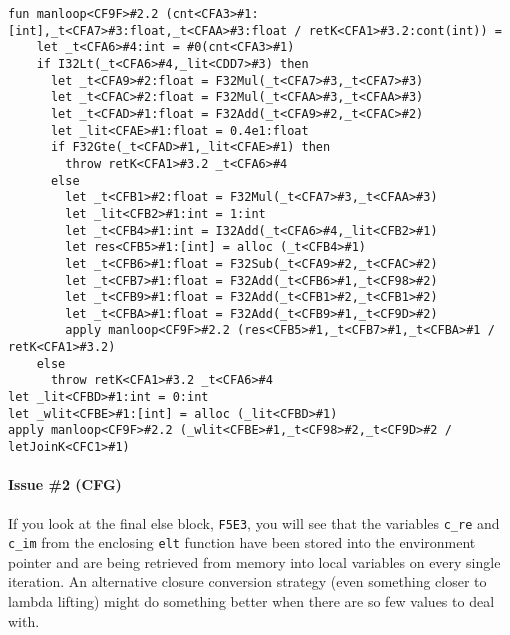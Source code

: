 \documentclass[11pt]{article}
\begin{document}
\begin{lstlisting}
fun manloop<CF9F>#2.2 (cnt<CFA3>#1:[int],_t<CFA7>#3:float,_t<CFAA>#3:float / retK<CFA1>#3.2:cont(int)) =
    let _t<CFA6>#4:int = #0(cnt<CFA3>#1)
    if I32Lt(_t<CFA6>#4,_lit<CDD7>#3) then
      let _t<CFA9>#2:float = F32Mul(_t<CFA7>#3,_t<CFA7>#3)
      let _t<CFAC>#2:float = F32Mul(_t<CFAA>#3,_t<CFAA>#3)
      let _t<CFAD>#1:float = F32Add(_t<CFA9>#2,_t<CFAC>#2)
      let _lit<CFAE>#1:float = 0.4e1:float
      if F32Gte(_t<CFAD>#1,_lit<CFAE>#1) then
        throw retK<CFA1>#3.2 _t<CFA6>#4
      else
        let _t<CFB1>#2:float = F32Mul(_t<CFA7>#3,_t<CFAA>#3)
        let _lit<CFB2>#1:int = 1:int
        let _t<CFB4>#1:int = I32Add(_t<CFA6>#4,_lit<CFB2>#1)
        let res<CFB5>#1:[int] = alloc (_t<CFB4>#1)
        let _t<CFB6>#1:float = F32Sub(_t<CFA9>#2,_t<CFAC>#2)
        let _t<CFB7>#1:float = F32Add(_t<CFB6>#1,_t<CF98>#2)
        let _t<CFB9>#1:float = F32Add(_t<CFB1>#2,_t<CFB1>#2)
        let _t<CFBA>#1:float = F32Add(_t<CFB9>#1,_t<CF9D>#2)
        apply manloop<CF9F>#2.2 (res<CFB5>#1,_t<CFB7>#1,_t<CFBA>#1 / retK<CFA1>#3.2)
    else
      throw retK<CFA1>#3.2 _t<CFA6>#4
let _lit<CFBD>#1:int = 0:int
let _wlit<CFBE>#1:[int] = alloc (_lit<CFBD>#1)
apply manloop<CF9F>#2.2 (_wlit<CFBE>#1,_t<CF98>#2,_t<CF9D>#2 / letJoinK<CFC1>#1)
\end{lstlisting}

\paragraph{Issue \#2 (CFG)}
If you look at the final else block, \texttt{F5E3}, you will see that the variables \texttt{c\_re} and \texttt{c\_im} from the enclosing \texttt{elt} function have been stored into the environment pointer and are being retrieved from memory into local variables on every single iteration. An alternative closure conversion strategy (even something closer to lambda lifting) might do something better when there are so few values to deal with.
\end{document}
